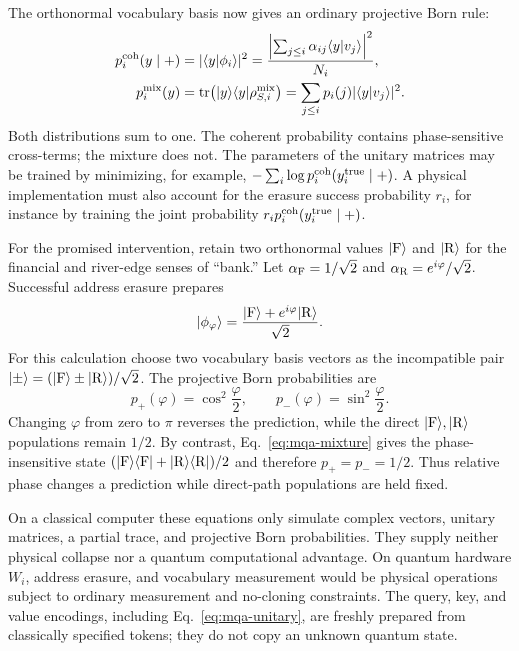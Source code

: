 \documentclass[
  aps,
  reprint,
  superscriptaddress,
  floatfix,
  nofootinbib,
  longbibliography
]{revtex4-2}
\begin{document}
The orthonormal vocabulary basis now gives an ordinary projective Born rule:
\begin{equation}
\begin{aligned}
 p_i^{\rm coh}(y\mid +)
 &=|\langle y|\phi_i\rangle|^2
 =\frac{\left|\sum_{j\leq i}
       \alpha_{ij}\langle y|v_j\rangle\right|^2}{N_i},\\
 p_i^{\rm mix}(y)
 &=\operatorname{tr}\!\left(
 |y\rangle\langle y|\rho_{S,i}^{\rm mix}\right)
 =\sum_{j\leq i}p_i(j)|\langle y|v_j\rangle|^2 .
\end{aligned}
\label{eq:mqa-vocabulary}
\end{equation}
Both distributions sum to one.  The coherent probability contains
phase-sensitive cross-terms; the mixture does not.  The parameters of the
unitary matrices may be trained by minimizing, for example,
$-\sum_i\log p_i^{\rm coh}(y_i^{\rm true}\mid +)$.  A physical implementation
must also account for the erasure success probability $r_i$, for instance by
training the joint probability $r_i p_i^{\rm coh}(y_i^{\rm true}\mid +)$.

For the promised intervention, retain two orthonormal values
$|{\rm F}\rangle$ and $|{\rm R}\rangle$ for the financial and river-edge
senses of ``bank.''  Let
$\alpha_{\rm F}=1/\sqrt2$ and
$\alpha_{\rm R}=e^{i\varphi}/\sqrt2$.  Successful address erasure prepares
\begin{equation}
 |\phi_\varphi\rangle
 =\frac{|{\rm F}\rangle+e^{i\varphi}|{\rm R}\rangle}{\sqrt2}.
\label{eq:mqa-bank-state}
\end{equation}
For this calculation choose two vocabulary basis vectors as the incompatible
pair $|\mathord{\pm}\rangle=(|{\rm F}\rangle\pm|{\rm R}\rangle)/\sqrt2$.
The projective Born probabilities are
\begin{equation}
 p_+(\varphi)=\cos^2\frac{\varphi}{2},\qquad
 p_-(\varphi)=\sin^2\frac{\varphi}{2}.
\label{eq:mqa-bank-fringe}
\end{equation}
Changing $\varphi$ from zero to $\pi$ reverses the prediction, while the
direct $|{\rm F}\rangle,|{\rm R}\rangle$ populations remain $1/2$.  By
contrast, Eq.~\eqref{eq:mqa-mixture} gives the phase-insensitive state
$(|{\rm F}\rangle\langle{\rm F}|
 +|{\rm R}\rangle\langle{\rm R}|)/2$ and therefore $p_+=p_-=1/2$.
Thus relative phase changes a prediction while direct-path populations are
held fixed.

On a classical computer these equations only simulate complex vectors,
unitary matrices, a partial trace, and projective Born probabilities.  They
supply neither physical collapse nor a quantum computational advantage.  On
quantum hardware $W_i$, address erasure, and vocabulary measurement would be
physical operations subject to ordinary measurement and no-cloning
constraints.  The query, key, and value encodings, including
Eq.~\eqref{eq:mqa-unitary}, are freshly prepared from classically specified
tokens; they do not copy an unknown quantum state.
\end{document}
